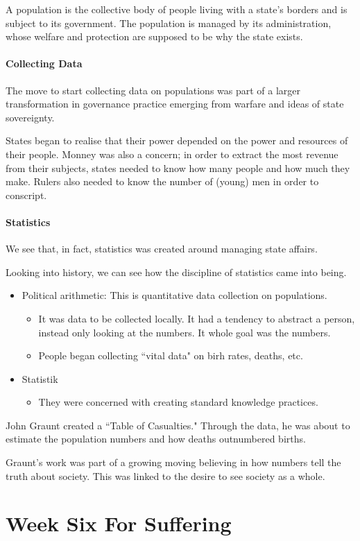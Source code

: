 \documentclass[openany]{book}
\begin{document}
\begin{defn}[Population]
	A population is the collective body of people living with a state's borders and is subject to its government. The population is managed by its administration, whose welfare and protection are supposed to be why the state exists.
\end{defn}

\subsubsection{Collecting Data}
The move to start collecting data on populations was part of a larger transformation in governance practice emerging from warfare and ideas of state sovereignty.

States began to realise that their power depended on the power and resources of their people. Monney was also a concern; in order to extract the most revenue from their subjects, states needed to know how many people and how much they make. Rulers also needed to know the number of (young) men in order to conscript.

\subsubsection{Statistics}
We see that, in fact, statistics was created around managing state affairs.

Looking into history, we can see how the discipline of statistics came into being.
\begin{itemize}
	\item Political arithmetic: This is quantitative data collection on populations.
	\begin{itemize}
		\item It was data to be collected locally. It had a tendency to abstract a person, instead only looking at the numbers. It whole goal was the numbers.
		\item People began collecting ``vital data" on birh rates, deaths, etc.
	\end{itemize}
	\item Statistik
	\begin{itemize}
		\item They were concerned with creating standard knowledge practices.
	\end{itemize}
\end{itemize}

\begin{example}
	John Graunt created a ``Table of Casualties." Through the data, he was about to estimate the population numbers and how deaths outnumbered births.
\end{example}

Graunt's work was part of a growing moving believing in how numbers tell the truth about society. This was linked to the desire to see society as a whole.

\chapter{Week Six For Suffering}
\end{document}
